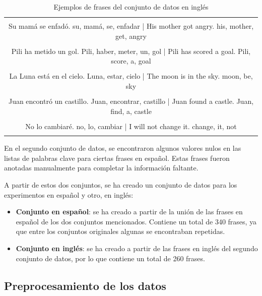 \documentclass[11pt,spanish,listoffigures,listoftables]{tfgetsinf}
\begin{document}
\begin{table}[!h]
\caption{Ejemplos de frases del conjunto de datos en inglés}
\begin{center}
\begin{tabular}{ | c | }
\hline
	\\
	Su mamá se enfadó.	su, mamá, se, enfadar | His mother got angry.	his, mother, get, angry \\
	\\
	Pili ha metido un gol.	Pili, haber, meter, un, gol | Pili has scored a goal.	Pili, score, a, goal \\
	\\
	La Luna está en el cielo.	Luna, estar, cielo | The moon is in the sky.	moon, be, sky \\
	\\
	Juan encontró un castillo.	Juan, encontrar, castillo | Juan found a castle.	Juan, find, a, castle \\
	\\
	No lo cambiaré.	no, lo, cambiar | I will not change it.	change, it, not \\
	\\
\hline
\end{tabular}
\end{center}
\label{tab: ejemplosInglés}
\end{table}

En el segundo conjunto de datos, se encontraron algunos valores nulos en las listas de palabras clave para ciertas frases en español. Estas frases fueron anotadas manualmente para completar la información faltante.

A partir de estos dos conjuntos, se ha creado un conjunto de datos para los experimentos en español y otro, en inglés:

\begin{itemize}
	\item \textbf{Conjunto en español}: se ha creado a partir de la unión de las frases en español de los dos conjuntos mencionados. Contiene un total de 340 frases, ya que entre los conjuntos originales algunas se encontraban repetidas.
	\item \textbf {Conjunto en inglés}: se ha creado a partir de las frases en inglés del segundo conjunto de datos, por lo que contiene un total de 260 frases.
\end{itemize}

\subsection{Preprocesamiento de los datos}
\end{document}
